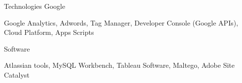 \begin{cventries}
	\zcventry
	{Technologies Google} %
	{
		\begin{cvitems} %
			\item {Google Analytics, Adwords, Tag Manager, Developer Console (Google APIs), Cloud Platform, Apps Scripts}
		\end{cvitems}
	}
	
	\zcventry
	{Software} %
	{
		\begin{cvitems} %
			\item {Atlassian tools, MySQL Workbench, Tableau Software, Maltego, Adobe Site Catalyst}
		\end{cvitems}
	}
	
\end{cventries}

